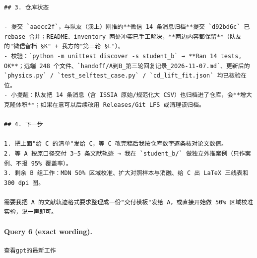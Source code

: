 \documentclass[UTF8,10pt]{ctexart}
\begin{document}
\begin{Verbatim}[breaklines=true,breakanywhere=true,fontsize=\scriptsize,frame=single,framesep=2pt]
## 3. 仓库状态

- 提交 `aaecc2f`，与队友（溪上）刚推的**微信 14 条消息归档**提交 `d92bd6c` 已 rebase 合并；README、inventory 两处冲突已手工解决，**两边内容都保留**（队友的"微信留档 §K" + 我方的"第三轮 §L"）。
- 校验：`python -m unittest discover -s student_b` → **Ran 14 tests, OK**；远端 248 个文件、`handoff/A到B_第三轮回复记录_2026-11-07.md`、更新后的 `physics.py` / `test_selftest_case.py` / `cd_lift_fit.json` 均已核验在位。
- 小提醒：队友把 14 条消息（含 ISSIA 原始/规范化大 CSV）也归档进了仓库，会**增大克隆体积**；如果在意可以后续改用 Releases/Git LFS 或清理该归档。

## 4. 下一步

1. 把上面"给 C 的清单"发给 C，等 C 改完稿后我按仓库数字逐条核对论文数值。
2. 等 A 按原口径交付 3–5 条文献轨迹 → 我在 `student_b/` 做独立外推案例（只作案例、不报 95% 覆盖率）。
3. 剩余 B 组工作：MDN 50% 区域校准、扩大对照样本与消融、给 C 出 LaTeX 三线表和 300 dpi 图。

需要我把 A 的文献轨迹格式要求整理成一份"交付模板"发给 A，或直接开始做 50% 区域校准实验，说一声即可。
\end{Verbatim}

\paragraph{Query 6 (exact wording).}
\begin{Verbatim}[breaklines=true,breakanywhere=true,fontsize=\scriptsize,frame=single,framesep=2pt]
查看gpt的最新工作
\end{Verbatim}
\end{document}
